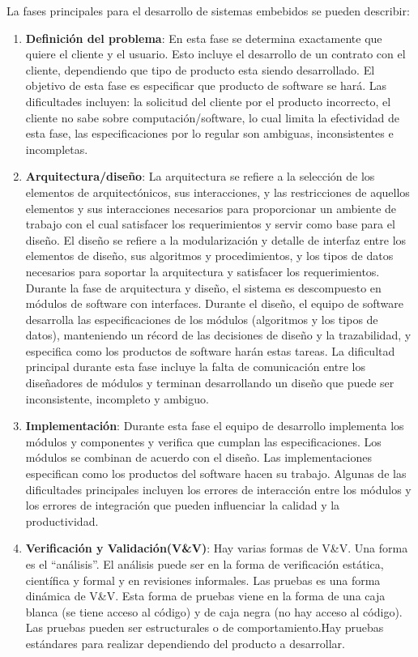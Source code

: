 \documentclass[12pt,twoside]{book}
\begin{document}
La fases principales para el desarrollo de sistemas embebidos se pueden describir:
\begin{enumerate}
	\item \textbf{Definición del problema}: En esta fase se determina exactamente que quiere el cliente y el usuario. Esto incluye el desarrollo de un contrato con el cliente, dependiendo que tipo de producto esta siendo desarrollado. El objetivo de esta fase es especificar que producto de software se hará. Las dificultades incluyen: la solicitud del cliente por el producto incorrecto, el cliente no sabe sobre computación/software, lo cual limita la efectividad de esta fase, las especificaciones por lo regular son ambiguas, inconsistentes e incompletas.
	\item \textbf{Arquitectura/diseño}: La arquitectura se refiere a la selección de los elementos de arquitectónicos, sus interacciones, y las restricciones de aquellos elementos y sus interacciones necesarios para proporcionar un ambiente de trabajo con el cual satisfacer los requerimientos y servir como base para el diseño.  El diseño se refiere a la modularización y detalle de interfaz entre los elementos de diseño, sus algoritmos y procedimientos, y los tipos de datos necesarios para soportar la arquitectura y satisfacer los requerimientos. Durante la fase de arquitectura y diseño, el sistema es descompuesto en módulos de software con interfaces. Durante el diseño, el equipo de software desarrolla las especificaciones de los módulos (algoritmos y los tipos de datos),  manteniendo un récord de las decisiones de diseño y la trazabilidad, y especifica como los productos de software harán estas tareas. La dificultad principal durante esta fase incluye la falta de comunicación entre los diseñadores de módulos y terminan desarrollando un diseño que puede ser inconsistente, incompleto y ambiguo.
	\item \textbf{Implementación}: Durante esta fase el equipo de desarrollo implementa los módulos y componentes y verifica que cumplan las especificaciones. Los módulos se combinan de acuerdo con el diseño. Las implementaciones especifican como los productos del software hacen su trabajo. Algunas de las dificultades principales incluyen los errores de interacción entre los módulos y los errores de integración que pueden influenciar la calidad y la productividad.

	\item \textbf{Verificación y Validación(V\&V)}: Hay varias formas de V\&V. Una forma es el ``análisis''. El análisis puede ser en la forma de verificación estática, científica y formal y en revisiones informales. Las pruebas es una forma dinámica de V\&V. Esta forma de pruebas viene en la forma de una caja blanca (se tiene acceso al código) y de caja negra (no hay acceso al código). Las pruebas pueden ser estructurales o de comportamiento.Hay pruebas estándares para realizar dependiendo del producto a desarrollar.
	 
\end{enumerate}
\end{document}
